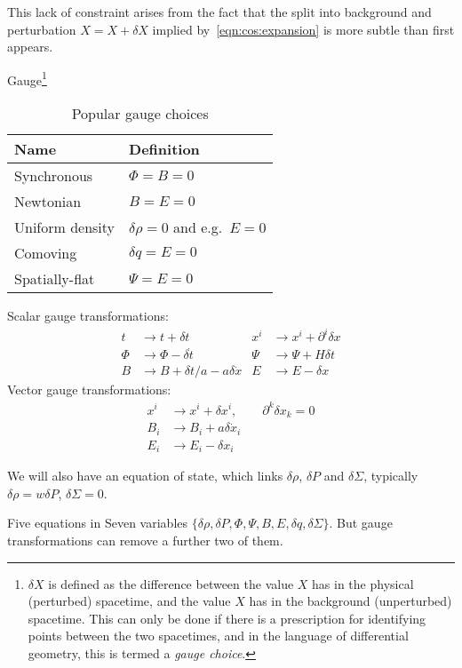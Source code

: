 This lack of constraint arises from the fact that the split into background and perturbation $X=X+\delta X$ implied by~\eqref{eqn:cos:expansion} is more subtle than first appears. 

Gauge\footnote{$\delta X$ is defined as the difference between the value $X$ has in the physical (perturbed) spacetime, and the value $X$ has in the background (unperturbed) spacetime. This can only be done if there is a prescription for identifying points between the two spacetimes, and in the language of differential geometry, this is termed a {\em gauge choice}.}

\begin{table}
  \centering
\begin{tabular}{ll}
 \toprule
  Name & Definition \\
 \midrule
 \midrule
 Synchronous & $\Phi=B=0$ \\
 Newtonian & $B=E=0$ \\
 Uniform density & $\delta\rho=0$ and e.g.\ $E=0$ \\
 Comoving & $\delta q = E = 0$ \\
 Spatially-flat & $\Psi=E=0$ \\
 \bottomrule
\end{tabular}
\caption{Popular gauge choices}\label{tab:cos:gauge_choice}
\end{table}
Scalar gauge transformations:
\begin{align}
      t &\rightarrow t + \delta t 
  & x^i &\rightarrow x^i + \partial^i \delta x  \\
   \Phi &\rightarrow \Phi - \delta \dot{t}
  &\Psi &\rightarrow \Psi +H \delta t  \\
      B &\rightarrow B + \delta t/a - a\delta \dot{x}
  &   E &\rightarrow E - \delta x 
\end{align}
Vector gauge transformations:
\begin{align}
  x^i &\rightarrow x^i + \delta x^i, \qquad \partial^k\delta x_k = 0   \\
  B_i &\rightarrow  B_i + a \delta\dot{x}_i \\
  E_i & \rightarrow E_i - \delta x_i
\end{align}

We will also have an equation of state, which links $\delta\rho$, $\delta P$ and $\delta\Sigma$, typically $\delta\rho = w \delta P$, $\delta\Sigma=0$.

Five equations in Seven variables $\{\delta\rho, \delta P, \Phi, \Psi, B, E, \delta q, \delta\Sigma\}$. But gauge transformations can remove a further two of them.


